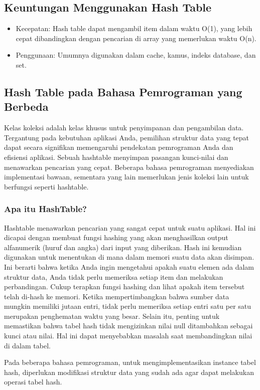 \documentclass{article}
\begin{document}
\subsection{Keuntungan Menggunakan Hash Table}
\begin{itemize}
    \item Kecepatan: Hash table dapat mengambil item dalam waktu O(1), yang lebih cepat dibandingkan dengan pencarian di array yang memerlukan waktu O(n).
    \item Penggunaan: Umumnya digunakan dalam cache, kamus, indeks database, dan set.
\end{itemize}

\subsection{Hash Table pada Bahasa Pemrograman yang Berbeda}
Kelas koleksi adalah kelas khusus untuk penyimpanan dan pengambilan data. Tergantung pada kebutuhan aplikasi Anda, pemilihan struktur data yang tepat dapat secara signifikan memengaruhi pendekatan pemrograman Anda dan efisiensi aplikasi. Sebuah hashtable menyimpan pasangan kunci-nilai dan menawarkan pencarian yang cepat. Beberapa bahasa pemrograman menyediakan implementasi bawaan, sementara yang lain memerlukan jenis koleksi lain untuk berfungsi seperti hashtable.

\subsubsection{Apa itu HashTable?}
Hashtable menawarkan pencarian yang sangat cepat untuk suatu aplikasi. Hal ini dicapai dengan membuat fungsi hashing yang akan menghasilkan output alfanumerik (huruf dan angka) dari input yang diberikan. Hash ini kemudian digunakan untuk menentukan di mana dalam memori suatu data akan disimpan. Ini berarti bahwa ketika Anda ingin mengetahui apakah suatu elemen ada dalam struktur data, Anda tidak perlu memeriksa setiap item dan melakukan perbandingan. Cukup terapkan fungsi hashing dan lihat apakah item tersebut telah di-hash ke memori. Ketika mempertimbangkan bahwa sumber data mungkin memiliki jutaan entri, tidak perlu memeriksa setiap entri satu per satu merupakan penghematan waktu yang besar. Selain itu, penting untuk memastikan bahwa tabel hash tidak mengizinkan nilai null ditambahkan sebagai kunci atau nilai. Hal ini dapat menyebabkan masalah saat membandingkan nilai di dalam tabel.

Pada beberapa bahasa pemrograman, untuk mengimplementasikan instance tabel hash, diperlukan modifikasi struktur data yang sudah ada agar dapat melakukan operasi tabel hash.
\end{document}
